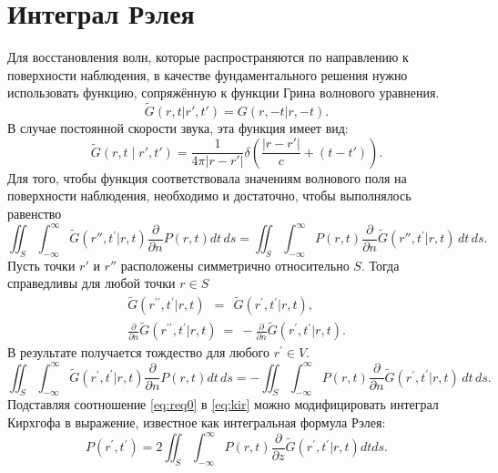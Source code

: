 \documentclass[a4paper, fontsize=14pt]{article}
\begin{document}
	\section{Интеграл Рэлея}
	Для восстановления волн, которые распространяются по направлению к поверхности наблюдения, в качестве фундаментального решения нужно использовать функцию, сопряжённую к функции Грина волнового уравнения.
	\begin{equation}
	\widetilde{G}( r,t|r',t')=G(r,-t|r,-t).
	\end{equation}
	В случае постоянной скорости звука, эта функция имеет вид:
	\begin{equation}
	\widetilde{G}(r,t\mid r',t')=\frac{1}{4\pi\left|r-r'\right|}\delta\left(\frac{\left|r-r'\right|}{c}+(t-t')\right).
	\end{equation}
	Для того, чтобы функция соответствовала значениям волнового поля на поверхности наблюдения, необходимо и достаточно, чтобы выполнялось равенство
	\begin{equation}
	\iint_{S}\int_{-\infty}^{\infty}{\widetilde{G}}\left(r'',t^{\prime}|r,t\right){\frac{\partial}{\partial n}}P(r,t)d t\,d s = \iint_{S}\int_{-\infty}^{\infty}P(r,t){\frac{\partial}{\partial n}}{\widetilde{G}}\left(r'',t^{\prime}|r,t\right)\,d t\,d s.
	\end{equation}
	Пусть точки $r'$ и $r''$ расположены симметрично относительно $S$. Тогда справедливы для любой точки $r\in S$
	\begin{eqnarray}
		\widetilde{{{G}}}\left({r}^{\prime\prime},t^{\prime}|{r},t\right)~~=~~\widetilde{G}\left({r}^{\prime},t^{\prime}|{r},t\right), \\
		\frac{\partial}{\partial n}\widetilde G\left({ r}^{\prime\prime},t^{\prime}|{ r},t\right)~=~-\frac{\partial}{\partial n}\widetilde G\left({ r}^{\prime},t^{\prime}|{ r},t\right).
	\end{eqnarray}
	В результате получается тождество для любого ${ r}^{\prime}\in V$.
	\begin{equation}
	\iint_{S}\int_{-\infty}^{\infty}\widetilde{G}\left({r}^{\prime},t^{\prime}|{r},t\right)\frac{\partial}{\partial n}P({r},t)d t\,d s = -\iint_{S}\int_{-\infty}^{\infty}P({ r},t){\frac{\partial}{\partial n}}\widetilde{G}\left({ r}^{\prime},t^{\prime}|{ r},t\right)\,d t\,d s.
	\label{eq:req0}
	\end{equation}
Подставляя соотношение \ref{eq:req0} в \ref{eq:kir} можно модифицировать интеграл Кирхгофа в выражение, 
известное как интегральная формула Рэлея:
\begin{equation}
P({ r}^{\prime},t^{\prime})=2\iint_{S}\int_{-\infty}^{\infty}P({ r},t)\frac{\partial}{\partial z}\widetilde{G}\left({ r}^{\prime},t^{\prime}|{ r},t\right)d t d s.
\label{eq:rayleighorig}
\end{equation}
\end{document}
